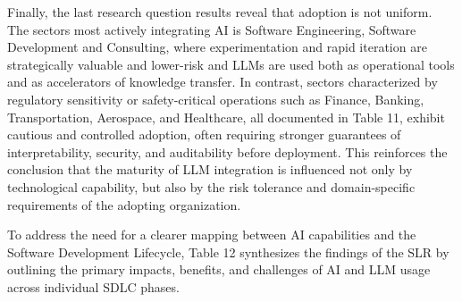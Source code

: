Finally, the last research question results reveal that adoption is not uniform. The sectors most actively integrating AI is Software Engineering, Software Development and Consulting, where experimentation and rapid iteration are strategically valuable and lower-risk and LLMs are used both as operational tools and as accelerators of knowledge transfer. In contrast, sectors characterized by regulatory sensitivity or safety-critical operations such as Finance, Banking, Transportation, Aerospace, and Healthcare, all documented in Table 11, exhibit cautious and controlled adoption, often requiring stronger guarantees of interpretability, security, and auditability before deployment. This reinforces the conclusion that the maturity of LLM integration is influenced not only by technological capability, but also by the risk tolerance and domain-specific requirements of the adopting organization.

To address the need for a clearer mapping between AI capabilities and the Software Development Lifecycle, Table 12 synthesizes the findings of the SLR by outlining the primary impacts, benefits, and challenges of AI and LLM usage across individual SDLC phases.

